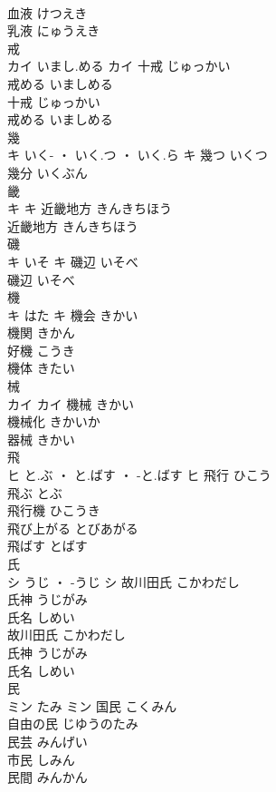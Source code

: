 \documentclass[8pt]{extreport}
\begin{document}
\begin{CJK}{UTF8}{min}
\\	血液	けつえき	
\\	乳液	にゅうえき	
\\	戒	
\\	カイ	いまし.める	カイ	十戒	じゅっかい	
\\	戒める	いましめる	
\\	十戒	じゅっかい	
\\	戒める	いましめる	
\\	幾	
\\	キ	いく- ・ いく.つ ・ いく.ら	キ	幾つ	いくつ	
\\	幾分	いくぶん	
\\	畿	
\\	キ		キ	近畿地方	きんきちほう	
\\	近畿地方	きんきちほう	
\\	磯	
\\	キ	いそ	キ	磯辺	いそべ	
\\	磯辺	いそべ	
\\	機	
\\	キ	はた	キ	機会	きかい	
\\	機関	きかん	
\\	好機	こうき	
\\	機体	きたい	
\\	械	
\\	カイ		カイ	機械	きかい	
\\	機械化	きかいか	
\\	器械	きかい	
\\	飛	
\\	ヒ	と.ぶ ・ と.ばす ・ -と.ばす	ヒ	飛行	ひこう	
\\	飛ぶ	とぶ	
\\	飛行機	ひこうき	
\\	飛び上がる	とびあがる	
\\	飛ばす	とばす	
\\	氏	
\\	シ	うじ ・ -うじ	シ	故川田氏	こかわだし	
\\	氏神	うじがみ	
\\	氏名	しめい	
\\	故川田氏	こかわだし	
\\	氏神	うじがみ	
\\	氏名	しめい	
\\	民	
\\	ミン	たみ	ミン	国民	こくみん	
\\	自由の民	じゆうのたみ	
\\	民芸	みんげい	
\\	市民	しみん	
\\	民間	みんかん	

\end{CJK}
\end{document}

